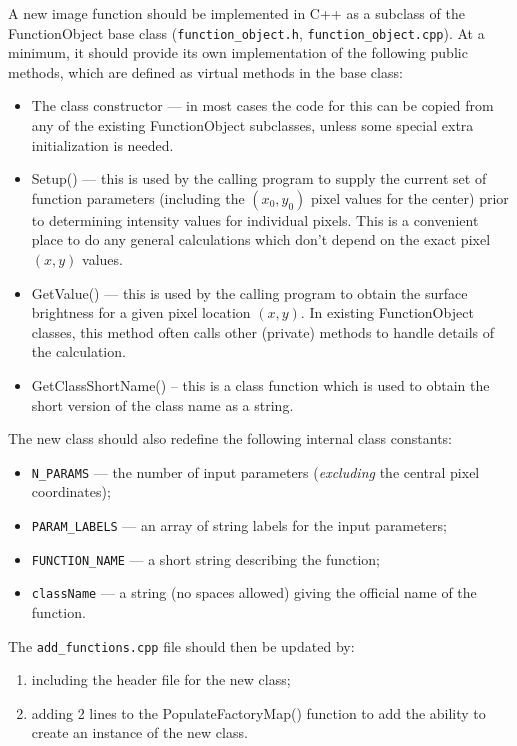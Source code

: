 \documentclass[10pt,a4paper,article]{memoir}
\begin{document}
A new image function should be implemented in C++ as a subclass of
the FunctionObject base class (\texttt{function\_object.h}, \texttt{function\_object.cpp}).
At a minimum, it should provide its own implementation of the following public methods,
which are defined as virtual methods in the base class:
\begin{itemize}
\item The class constructor --- in most cases the code for this can be copied from any of the
existing FunctionObject subclasses, unless some special extra initialization is needed.
\item Setup() --- this is used by the calling program to supply the current set of
function parameters (including the $(x_{0},y_{0})$ pixel values for the center) prior
to determining intensity values for individual pixels. This
is a convenient place to do any general calculations which don't depend on the
exact pixel $(x,y)$ values.
\item GetValue() --- this is used by the calling program to obtain the surface
brightness for a given pixel location $(x,y)$. In existing FunctionObject classes,
this method often calls other (private) methods to handle details of the calculation.
\item GetClassShortName() -- this is a class function which is used to obtain
the short version of the class name as a string.

\end{itemize}

The new class should also redefine the following internal class constants:
\begin{itemize}
\item \texttt{N\_PARAMS} --- the number of input parameters (\textit{excluding} the
central pixel coordinates);
\item \texttt{PARAM\_LABELS} --- an array of string labels for the input parameters;
\item \texttt{FUNCTION\_NAME} --- a short string describing the function;
\item \texttt{className} --- a string (no spaces allowed) giving the official name
of the function.
\end{itemize}

The \texttt{add\_functions.cpp} file should then be updated by:
\begin{enumerate}
\item including the header file for the new class;
\item adding 2 lines to the PopulateFactoryMap() function to add the ability to create an instance of
the new class.
\end{enumerate}
\end{document}
